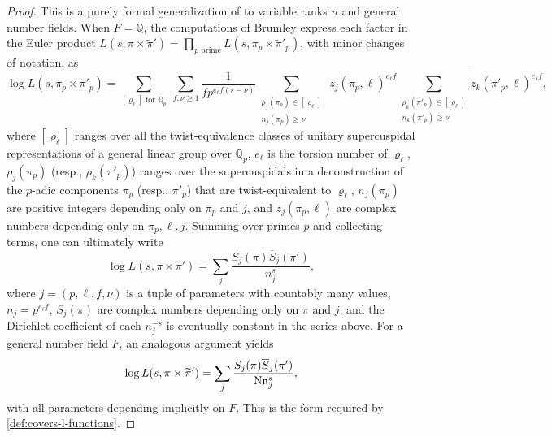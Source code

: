 \documentclass[11pt]{amsart}
\theoremstyle{remark}
\numberwithin{equation}{section}
\newcommand{\n}{\mathfrak{n}}
\newcommand{\N}{\textnormal{N}}
\newcommand{\Q}{\mathbb{Q}}
\renewcommand{\bar}{\overline}
\renewcommand{\tilde}{\widetilde}
\begin{document}
\begin{proof}
This is a purely formal generalization of \cite[Proposition 4]{lichtman2024density} to variable ranks $n$ and general number fields. 
When $F = \Q$, the computations of Brumley \cite[Appendix A.2, (A.8)]{soundararajan2019weak} express each factor in the Euler product $L(s, \pi \times \tilde\pi') = \prod_{p\text{ prime}} L(s, \pi_p \times \tilde\pi'_p)$, with minor changes of notation, as
\[
    \log L(s, \pi_p \times \tilde \pi'_p) =
    \sum_{[\varrho_\ell] \text{ for } \Q_p}\ 
    \sum_{f, \nu \ge 1} 
    \frac{1}{f p^{e_\ell f(s-\nu)}}
    \sum_{\substack{\rho_j(\pi_p) \in [\varrho_\ell] \\ n_j(\pi_p) \ge \nu}}\ 
    z_j(\pi_p, \ell)^{e_\ell f}
    \bar{ \sum_{\substack{\rho_k(\pi'_p) \in [\varrho_\ell] \\ n_k(\pi'_p) \ge \nu}} 
    z_k(\pi'_p, \ell)^{e_\ell f}
    },
\]
where $[\varrho_\ell]$ ranges over all the twist-equivalence classes of unitary supercuspidal representations of a general linear group over $\Q_p$, $e_\ell$ is the torsion number of $\varrho_\ell$, $\rho_j(\pi_p)$ (resp., $\rho_k(\pi'_p)$) ranges over the supercuspidals in a deconstruction of the $p$-adic components $\pi_p$ (resp., $\pi'_p$) that are twist-equivalent to $\varrho_\ell$, $n_j(\pi_p)$ are positive integers depending only on $\pi_p$ and $j$, and $z_j(\pi_p, \ell)$ are complex numbers depending only on $\pi_p, \ell, j$. Summing over primes $p$ and collecting terms, one can ultimately write
\[
    \log L(s, \pi \times \tilde\pi') = \sum_j \frac{S_j(\pi) \bar S_j(\pi')}{n_j^s},
\]
where $j = (p, \ell, f, \nu)$ is a tuple of parameters with countably many values, $n_j = p^{e_\ell f}$, $S_j(\pi)$ are complex numbers depending only on $\pi$ and $j$, and the Dirichlet coefficient of each $n_j^{-s}$ is eventually constant in the series above. For a general number field $F$, an analogous argument yields
\begin{equation} \label{eqn:log-non-def}
    \log L(s, \pi \times \tilde \pi') = \sum_j \frac{S_j(\pi) \bar S_j(\pi')}{\N \n_j^s},
\end{equation}
with all parameters depending implicitly on $F$. This is the form required by \cref{def:covers-l-functions}.
\end{proof}
\end{document}
